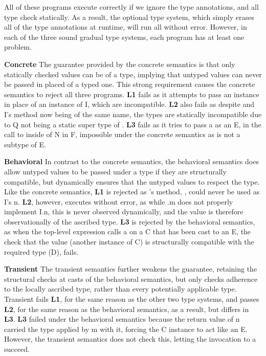 \documentclass[runnningheads]{tex/llncs}
\begin{document}
All of these programs execute correctly if we ignore the type annotations, and
all type check statically. As a result, the optional type system, which simply
erases all of the type annotations at runtime, will run all without error.
However, in each of the three sound gradual type systems, each program has at
least one problem.

{\bf Concrete} The guarantee provided by the concrete semantics is that only
statically checked values can be of a type, implying that untyped values can
never be passed in placed of a typed one. This strong requirement causes the
concrete semantics to reject all three programs. {\bf L1} fails as it attempts
to pass an \A instance in place of an instance of \xt I, which are incompatible.
{\bf L2} also fails as despite \A and \xt I's method now being of the same
name, the types are statically incompatible due to \xt Q not being a static
super type of \A. {\bf L3} fails as it tries to pass a \C as an \xt E, in the
call to \m inside of \xt N in \xt F, impossible under the concrete semantics
as \C is not a subtype of \xt E.

{\bf Behavioral} In contrast to the concrete semantics, the behavioral
semantics  does allow untyped values to be passed under a type if they are
structurally compatible, but dynamically ensures that the untyped values to
respect the type. Like the concrete semantics, {\bf L1} is rejected as \A's
method, \m, could never be used as \xt I's \xt n. {\bf L2}, however, executes
without error, as while \A.\xt m does not properly implement \xt I.\xt n, this
is never observed dynamically, and the value is therefore observationally of
the ascribed type. {\bf L3} is rejected by the behavioral semantics, as when
the top-level expression calls \xt a on a \xt C that has been cast to an \xt
E, the check that the value (another instance of \xt C) is structurally
compatible with the required type (\xt D), fails.

{\bf Transient} The transient semantics further weakens the guarantee,
retaining the structural checks at casts of the behavioral semantics, but only
checks adherence to the locally ascribed type, rather than every potentially
applicable type. Transient fails {\bf L1}, for the same reason as the other
two type systems, and passes {\bf L2}, for the same reason as the behavioral
semantics, as a result, but differs in {\bf L3}. {\bf L3} failed under the
behavioral semantics because the return value of \xt n carried the type
applied by \xt m with it, forcing the \xt C instance to act like an \xt E. 
However, the transient semantics does not check this, letting the invocation
to \xt a succeed.
\end{document}
